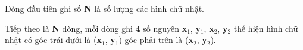 Dòng đầu tiên ghi số \textbf{N} là số lượng các hình chữ nhật.

Tiếp theo là \textbf{N} dòng, mỗi dòng ghi \textbf{4} số nguyên \textbf{x$_1$}, \textbf{y$_1$}, \textbf{x$_2$}, \textbf{y$_2$} thể hiện hình chữ nhật có góc trái dưới là (\textbf{x$_1$}, \textbf{y$_1$}) góc phải trên là (\textbf{x$_2$}, \textbf{y$_2$}).